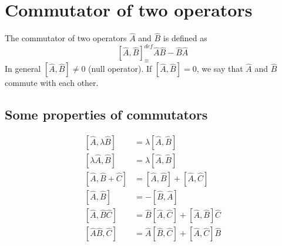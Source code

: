 \section{Commutator of two operators}
The commutator of two operators $\hat{A}$ and $\hat{B}$ is defined as
\begin{equation}\label{eqn3.11}
[\hat{A}, \hat{B}] _\equiv^{def} \hat{A}\hat{B} - \hat{B}\hat{A}
\end{equation}
In general $[\hat{A}, \hat{B}] \neq 0 $ (null operator). If $[\hat{A}, \hat{B}] = 0$, we say that $\hat{A}$ and $\hat{B}$ commute with each other.

\subsection{Some properties of commutators}
\begin{align}\label{eqn3.12-3.17}
	[\hat{A}, \lambda \hat{B}] &= \lambda [\hat{A}, \hat{B}] \\
	[\lambda \hat{A}, \hat{B}] &= \lambda [\hat{A}, \hat{B}] \\
	[\hat{A}, \hat{B} + \hat{C}] &= [\hat{A}, \hat{B}] + [\hat{A}, \hat{C}]\\
	[\hat{A}, \hat{B}] &= - [\hat{B}, \hat{A}]\\
	[\hat{A}, \hat{B}\hat{C}] &= \hat{B}[\hat{A}, \hat{C}] + [\hat{A}, \hat{B}] \hat{C}\\
	[\hat{A}\hat{B}, \hat{C}] &= \hat{A}[\hat{B}, \hat{C}] + [\hat{A}, \hat{C}] \hat{B}
\end{align}
